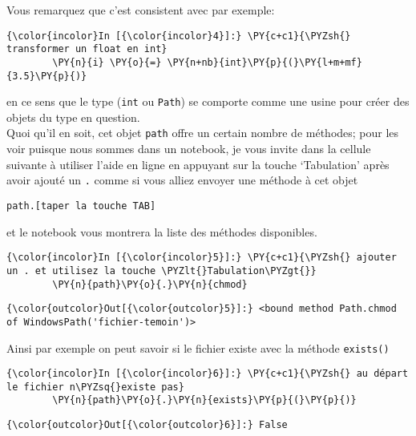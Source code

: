     Vous remarquez que c'est consistent avec par exemple:

    \begin{Verbatim}[commandchars=\\\{\}]
{\color{incolor}In [{\color{incolor}4}]:} \PY{c+c1}{\PYZsh{} transformer un float en int}
        \PY{n}{i} \PY{o}{=} \PY{n+nb}{int}\PY{p}{(}\PY{l+m+mf}{3.5}\PY{p}{)}
\end{Verbatim}


    en ce sens que le type (\texttt{int} ou \texttt{Path}) se comporte comme
une usine pour créer des objets du type en question.\\

    Quoi qu'il en soit, cet objet \texttt{path} offre un certain nombre de
méthodes; pour les voir puisque nous sommes dans un notebook, je vous
invite dans la cellule suivante à utiliser l'aide en ligne en appuyant
sur la touche `Tabulation' après avoir ajouté un \texttt{.} comme si
vous alliez envoyer une méthode à cet objet

\begin{verbatim}
path.[taper la touche TAB]
\end{verbatim}

et le notebook vous montrera la liste des méthodes disponibles.

    \begin{Verbatim}[commandchars=\\\{\}]
{\color{incolor}In [{\color{incolor}5}]:} \PY{c+c1}{\PYZsh{} ajouter un . et utilisez la touche \PYZlt{}Tabulation\PYZgt{}}
        \PY{n}{path}\PY{o}{.}\PY{n}{chmod}
\end{Verbatim}


\begin{Verbatim}[commandchars=\\\{\}]
{\color{outcolor}Out[{\color{outcolor}5}]:} <bound method Path.chmod of WindowsPath('fichier-temoin')>
\end{Verbatim}
            
    Ainsi par exemple on peut savoir si le fichier existe avec la méthode
\texttt{exists()}

    \begin{Verbatim}[commandchars=\\\{\}]
{\color{incolor}In [{\color{incolor}6}]:} \PY{c+c1}{\PYZsh{} au départ le fichier n\PYZsq{}existe pas}
        \PY{n}{path}\PY{o}{.}\PY{n}{exists}\PY{p}{(}\PY{p}{)}
\end{Verbatim}


\begin{Verbatim}[commandchars=\\\{\}]
{\color{outcolor}Out[{\color{outcolor}6}]:} False
\end{Verbatim}
            
